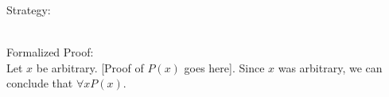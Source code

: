 \documentclass{article}
\begin{document}
\noindent Strategy:\\
\\
Formalized Proof:\\
Let $x$ be arbitrary. [Proof of $P(x)$ goes here]. Since $x$ was arbitrary, we can conclude that $\forall xP(x)$.

\clearpage
\printglossary[type=\acronymtype,style=long]  %
\printglossary[type=symbolslist,style=long]   %
\printglossary[type=main]                     %
\end{document}
